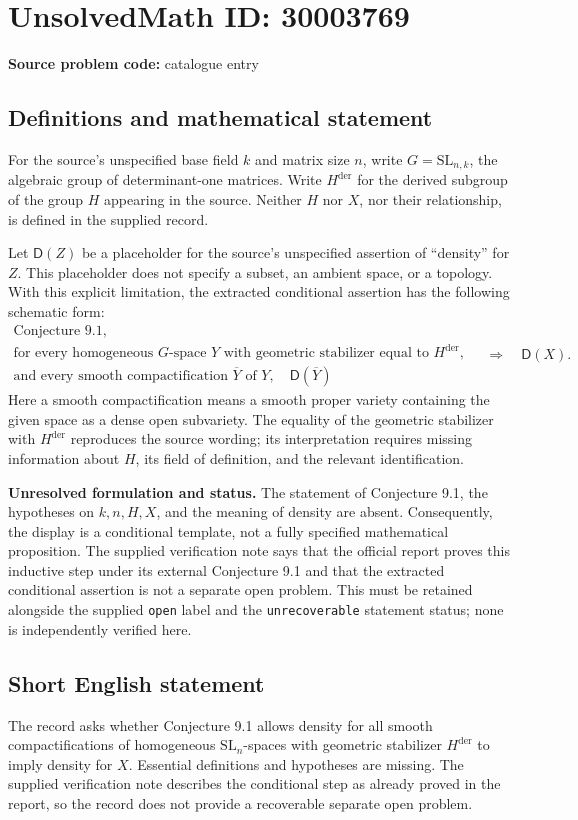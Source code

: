 \documentclass[11pt]{article}
\begin{document}
\section*{UnsolvedMath ID: 30003769}
\textbf{Source problem code:} catalogue entry
\subsection{Definitions and mathematical statement}
For the source's unspecified base field \(k\) and matrix size \(n\), write \(G=\mathrm{SL}_{n,k}\), the algebraic group of determinant-one matrices. Write \(H^{\mathrm{der}}\) for the derived subgroup of the group \(H\) appearing in the source. Neither \(H\) nor \(X\), nor their relationship, is defined in the supplied record.

Let \(\mathsf D(Z)\) be a placeholder for the source's unspecified assertion of ``density'' for \(Z\). This placeholder does not specify a subset, an ambient space, or a topology. With this explicit limitation, the extracted conditional assertion has the following schematic form:
\[
\begin{gathered}
\text{Conjecture 9.1},\\
\text{for every homogeneous }G\text{-space }Y
\text{ with geometric stabilizer equal to }H^{\mathrm{der}},\\
\text{and every smooth compactification }\overline Y\text{ of }Y,
\quad \mathsf D(\overline Y)
\end{gathered}
\quad\Longrightarrow\quad
\mathsf D(X).
\]
Here a smooth compactification means a smooth proper variety containing the given space as a dense open subvariety. The equality of the geometric stabilizer with \(H^{\mathrm{der}}\) reproduces the source wording; its interpretation requires missing information about \(H\), its field of definition, and the relevant identification.

\textbf{Unresolved formulation and status.} The statement of Conjecture 9.1, the hypotheses on \(k,n,H,X\), and the meaning of density are absent. Consequently, the display is a conditional template, not a fully specified mathematical proposition. The supplied verification note says that the official report proves this inductive step under its external Conjecture 9.1 and that the extracted conditional assertion is not a separate open problem. This must be retained alongside the supplied \texttt{open} label and the \texttt{unrecoverable} statement status; none is independently verified here.
\subsection{Short English statement}
The record asks whether Conjecture 9.1 allows density for all smooth compactifications of homogeneous \(\mathrm{SL}_n\)-spaces with geometric stabilizer \(H^{\mathrm{der}}\) to imply density for \(X\). Essential definitions and hypotheses are missing. The supplied verification note describes the conditional step as already proved in the report, so the record does not provide a recoverable separate open problem.
\end{document}
